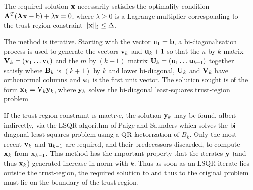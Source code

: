 \documentclass{galahad}
\begin{document}

\galmethod
The required solution ${\mathbf{x}}$ necessarily satisfies the optimality condition 
${\mathbf{A}}^T ( {\mathbf{A}} {\mathbf{x}} - {\mathbf{b}} ) + \lambda {\mathbf{x}} = 0$, where $\lambda \geq 0$ 
is a Lagrange 
multiplier corresponding to the trust-region constraint 
$\|{\mathbf{x}}\|_2  \leq  \Delta$. 
 
\noindent 
The method is iterative. Starting  with the vector ${\mathbf{u}}_1 = {\mathbf{b}}$, a
bi-diagonalisation process is used to generate the vectors ${\mathbf{v}}_k$ and 
${\mathbf{u}}_k+1$ so that the $n$ by $k$ matrix ${\mathbf{V}}_k = ( {\mathbf{v}}_1 \ldots {\mathbf{v}}_k)$ 
and the $m$ by $(k+1)$ matrix ${\mathbf{U}}_k = ( {\mathbf{u}}_1 \ldots {\mathbf{u}}_{k+1})$ 
together satisfy
where ${\mathbf{B}}_k$ is $(k+1)$ by $k$ and lower bi-diagonal, ${\mathbf{U}}_k$ and 
${\mathbf{V}}_k$ have orthonormal columns and ${\mathbf{e}}_1$ is the first unit vector. 
The solution sought is of the form ${\mathbf{x}}_k = {\mathbf{V}}_k {\mathbf{y}}_k$, where ${\mathbf{y}}_k$
solves the bi-diagonal least-squares trust-region problem

If the trust-region constraint is inactive, the solution ${\mathbf{y}}_k$
may be found, albeit indirectly, via the LSQR algorithm of Paige and Saunders
which solves the bi-diagonal least-squares problem
using a QR factorization of $B_k$. Only the most recent ${\mathbf{v}}_k$ and ${\mathbf{u}}_{k+1}$
are required, and their predecessors discarded, to compute ${\mathbf{x}}_k$ from
${\mathbf{x}}_{k-1}$. This method has the important property that the iterates 
${\mathbf{y}}$ (and thus ${\mathbf{x}}_k$) generated increase in norm with $k$. Thus 
as soon as an LSQR iterate lies outside the trust-region, the required solution
to  and thus to the original problem must lie on the boundary of the
trust-region.
\end{document}
